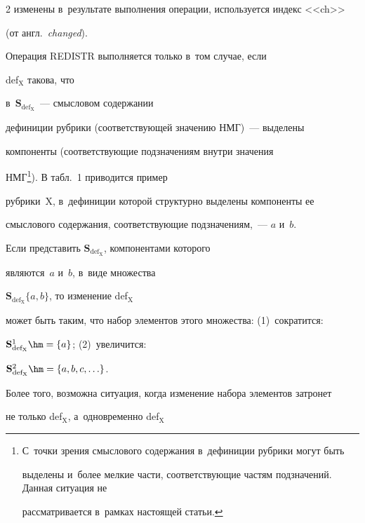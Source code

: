 \begin{multicols}{2}
изменены в~результате выполнения операции, используется индекс <<ch>> 


(от англ.\ \textit{changed}).





Операция REDISTR выполняется только в~том случае, если 


def$_{\mathrm{X}}$ такова, что 


в~$\mathbf{S}_{\mathrm{def}_{\mathrm{X}}}$~--- смысловом содержании 


дефиниции рубрики (соответствующей значению НМГ)~--- выделены 


компоненты (соответствующие подзначениям внутри значения 


НМГ\footnote{С~точки зрения смыслового содержания в~дефиниции рубрики могут быть 


выделены и~более мелкие части, соответствующие частям подзначений. Данная ситуация не 


рассматривается в~рамках настоящей статьи.}). В табл.~1 приводится пример  


руб\-ри\-ки~X, в~дефиниции которой структурно выделены компоненты ее 


смыслового содержания, соответствующие подзначениям,~--- $a$ и~$b$.














Если представить $\mathbf{S}_{\mathrm{def_X}}$, компонентами которого 


являются~$a$ и~$b$, в~виде множества 


$\mathbf{S}_{\mathrm{def_X}}\{a,b\}$, то изменение def$_{\mathrm{X}}$ 


может быть таким, что набор элементов этого множества: (1)~сократится: 


$\mathbf{S}_{\mathrm{def_X}}^1\hm=\{a\}$; (2)~увеличится: 


$\mathbf{S}_{\mathrm{def_X}}^2\hm=\{a, b, c, \ldots\}$.











Более того, возможна ситуация, когда изменение набора элементов затронет 


не только def$_{\mathrm{X}}$, а~одновременно def$_{\mathrm{X}}$ 



\end{multicols}
